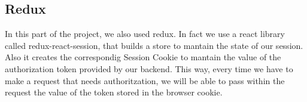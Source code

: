 \documentclass[./main.tex]{subfiles}
\begin{document}
\subsection{Redux}
In this part of the project, we also used redux. In fact we use a react library
called redux-react-session, that builds a store to mantain the state of our session.
Also it creates the correspondig Session Cookie to mantain the value of the authorization token
provided by our backend. This way, every time we have to make a request that needs authoritzation,
we will be able to pass within the request the value of the token stored in the browser cookie.
\end{document}
